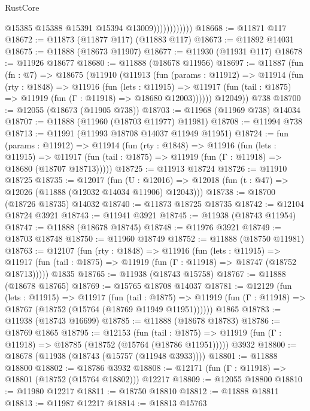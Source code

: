 \begin{lexlean}{RustCore}
\begin{coremodule}
                            @15385
                            @15388
                            @15391
                            @15394
                            @13009))))))))))))
@18668 := @11871 @117
@18672 := @11873 (@11877 @117) (@11883 @117)
@18673 := @11892 @14031
@18675 := @11888 (@18673 @11907)
@18677 := @11930 (@11931 @117)
@18678 := @11926 @18677
@18680 := @11888 (@18678 @11956)
@18697 := @11887
    (fun (fn : @7) =>
    @18675
      (@11910
        (@11913
          (fun (params : @11912) =>
          @11914
            (fun (rty : @1848) =>
            @11916
              (fun (lets : @11915) =>
              @11917 (fun (tail : @1875) => @11919 (fun (Γ : @11918) => @18680 @12003))))))
        @12049))
    @738
@18700 := @12055 (@18673 (@11905 @738))
@18703 := @11968 (@11969 @738) @14034
@18707 := @11888 (@11960 (@18703 @11977) @11981)
@18708 := @11994 @738
@18713 := @11991 (@11993 @18708 @14037 @11949 @11951)
@18724 := fun (params : @11912) =>
  @11914
    (fun (rty : @1848) =>
    @11916
      (fun (lets : @11915) =>
      @11917 (fun (tail : @1875) => @11919 (fun (Γ : @11918) => @18680 (@18707 @18713)))))
@18725 := @11913 @18724
@18726 := @11910 @18725
@18735 := @12017
    (fun (U : @12016) => @12018 (fun (t : @47) => @12026 (@11888 (@12032 @14034 @11906) @12043)))
@18738 := @18700 (@18726 @18735) @14032
@18740 := @11873 @18725 @18735
@18742 := @12104 @18724 @3921
@18743 := @11941 @3921
@18745 := @11938 (@18743 @11954)
@18747 := @11888 (@18678 @18745)
@18748 := @11976 @3921
@18749 := @18703 @18748
@18750 := @11960 @18749
@18752 := @11888 (@18750 @11981)
@18763 := @12107
    (fun (rty : @1848) =>
    @11916
      (fun (lets : @11915) =>
      @11917 (fun (tail : @1875) => @11919 (fun (Γ : @11918) => @18747 (@18752 @18713)))))
    @1835
@18765 := @11938 (@18743 @15758)
@18767 := @11888 (@18678 @18765)
@18769 := @15765 @18708 @14037
@18781 := @12129
    (fun (lets : @11915) =>
    @11917
      (fun (tail : @1875) =>
      @11919 (fun (Γ : @11918) => @18767 (@18752 (@15764 (@18769 @11949 @11951))))))
    @1865
@18783 := @11938 (@18743 @16699)
@18785 := @11888 (@18678 @18783)
@18786 := @18769 @1865
@18795 := @12153
    (fun (tail : @1875) => @11919 (fun (Γ : @11918) => @18785 (@18752 (@15764 (@18786 @11951)))))
    @3932
@18800 := @18678 (@11938 (@18743 (@15757 (@11948 @3933))))
@18801 := @11888 @18800
@18802 := @18786 @3932
@18808 := @12171 (fun (Γ : @11918) => @18801 (@18752 (@15764 @18802))) @12217
@18809 := @12055 @18800
@18810 := @11980 @12217
@18811 := @18750 @18810
@18812 := @11888 @18811
@18813 := @11987 @12217
@18814 := @18813 @15763

\end{coremodule}
\end{lexlean}
